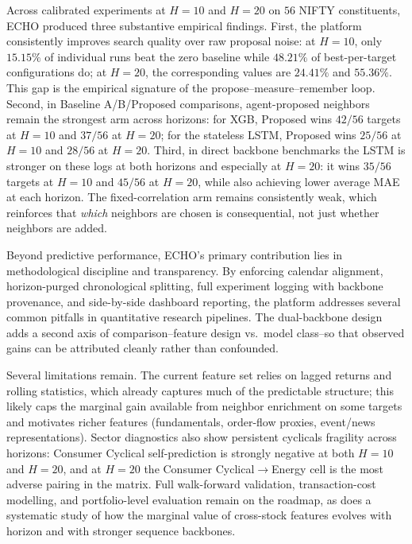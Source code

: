 \documentclass[12pt,a4paper,titlepage]{article}
\begin{document}
Across calibrated experiments at \(H=10\) and \(H=20\) on \(56\) NIFTY constituents, ECHO produced three substantive empirical findings. First, the platform consistently improves search quality over raw proposal noise: at \(H=10\), only \(15.15\%\) of individual runs beat the zero baseline while \(48.21\%\) of best-per-target configurations do; at \(H=20\), the corresponding values are \(24.41\%\) and \(55.36\%\). This gap is the empirical signature of the propose--measure--remember loop. Second, in Baseline A/B/Proposed comparisons, agent-proposed neighbors remain the strongest arm across horizons: for XGB, Proposed wins \(42/56\) targets at \(H=10\) and \(37/56\) at \(H=20\); for the stateless LSTM, Proposed wins \(25/56\) at \(H=10\) and \(28/56\) at \(H=20\). Third, in direct backbone benchmarks the LSTM is stronger on these logs at both horizons and especially at \(H=20\): it wins \(35/56\) targets at \(H=10\) and \(45/56\) at \(H=20\), while also achieving lower average MAE at each horizon. The fixed-correlation arm remains consistently weak, which reinforces that \emph{which} neighbors are chosen is consequential, not just whether neighbors are added.

Beyond predictive performance, ECHO's primary contribution lies in methodological discipline and transparency. By enforcing calendar alignment, horizon-purged chronological splitting, full experiment logging with backbone provenance, and side-by-side dashboard reporting, the platform addresses several common pitfalls in quantitative research pipelines. The dual-backbone design adds a second axis of comparison--feature design vs.\ model class--so that observed gains can be attributed cleanly rather than confounded.

Several limitations remain. The current feature set relies on lagged returns and rolling statistics, which already captures much of the predictable structure; this likely caps the marginal gain available from neighbor enrichment on some targets and motivates richer features (fundamentals, order-flow proxies, event/news representations). Sector diagnostics also show persistent cyclicals fragility across horizons: Consumer Cyclical self-prediction is strongly negative at both \(H=10\) and \(H=20\), and at \(H=20\) the Consumer Cyclical\(\rightarrow\)Energy cell is the most adverse pairing in the matrix. Full walk-forward validation, transaction-cost modelling, and portfolio-level evaluation remain on the roadmap, as does a systematic study of how the marginal value of cross-stock features evolves with horizon and with stronger sequence backbones.
\end{document}
